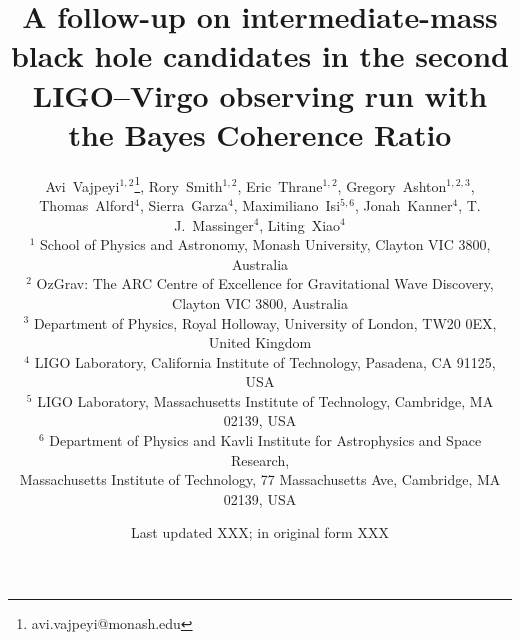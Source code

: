 \newcommand{\SPA}{School of Physics and Astronomy, Monash University, Clayton VIC 3800, Australia}
\newcommand{\OzGravMonash}{OzGrav: The ARC Centre of Excellence for Gravitational Wave Discovery, Clayton VIC 3800, Australia}
\newcommand{\CIT}{LIGO Laboratory, California Institute of Technology, Pasadena, CA 91125, USA}
\newcommand{\MIT}{LIGO Laboratory, Massachusetts Institute of Technology, Cambridge, MA 02139, USA}
\newcommand{\Kavli}{Department of Physics and Kavli Institute for Astrophysics and Space Research,\\ Massachusetts Institute of Technology, 77 Massachusetts Ave, Cambridge, MA 02139, USA}
\newcommand{\Royal}{Department of Physics, Royal Holloway, University of London, TW20 0EX, United Kingdom}





\title[An IMBH candidate follow-up in O2 using the BCR]{A follow-up on intermediate-mass black hole candidates in the second LIGO--Virgo observing run with the Bayes Coherence Ratio}



\author[Vajpeyi et al.]{Avi~Vajpeyi$^{1,2}$\thanks{avi.vajpeyi@monash.edu},
    Rory~Smith$^{1,2}$,
    Eric~Thrane$^{1,2}$,
    Gregory~Ashton$^{1,2,3}$,
    Thomas~Alford$^{4}$,
    \newauthor
    Sierra~Garza$^{4}$,
    Maximiliano~Isi$^{5,6}$,
    Jonah~Kanner$^{4}$,
    T. J.~Massinger$^{4}$,
    Liting~Xiao$^{4}$
\\
$^{1}$ \SPA \\
$^{2}$ \OzGravMonash \\
$^{3}$ \Royal \\
$^{4}$ \CIT \\
$^{5}$ \MIT \\
$^{6}$ \Kavli 
}

\date{Last updated XXX; in original form XXX}


